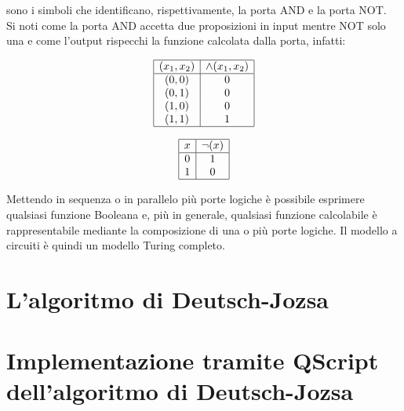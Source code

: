 \documentclass[12pt,a4paper,openright]{report}
\begin{document}
\noindent sono i simboli che identificano, rispettivamente, la porta AND e la porta NOT.\\
Si noti come la porta AND accetta due proposizioni in input mentre NOT solo una e come l'output rispecchi la funzione calcolata dalla porta, infatti:  \\

\vspace{\abovedisplayskip}
\begin{minipage}{.5\linewidth}
\begin{displaymath}
    \begin{array}{|c|c|}\hline
        (x_1, x_2) & \land{(x_1, x_2)} \\\hline 
        (0, 0)   &  0  \\ 
        (0, 1)   &  0  \\
        (1, 0)   &  0  \\
        (1, 1)   &  1  \\\hline
    \end{array}
    \end{displaymath}
\end{minipage}
\begin{minipage}{.5\linewidth}
\begin{displaymath}
    \begin{array}{|c|c|}\hline
        x & \neg{(x)} \\\hline 
        0   &  1  \\ 
        1   &  0  \\\hline
    \end{array}
\end{displaymath}
\end{minipage}

\vspace{\belowdisplayskip}
Mettendo in sequenza o in parallelo più porte logiche è possibile esprimere qualsiasi funzione Booleana e, più in generale, qualsiasi funzione calcolabile è rappresentabile mediante
la composizione di una o più porte logiche. Il modello a circuiti è quindi un modello Turing completo.\\


\chapter{L'algoritmo di Deutsch-Jozsa}

\chapter{Implementazione tramite QScript dell'algoritmo di Deutsch-Jozsa}
\end{document}
